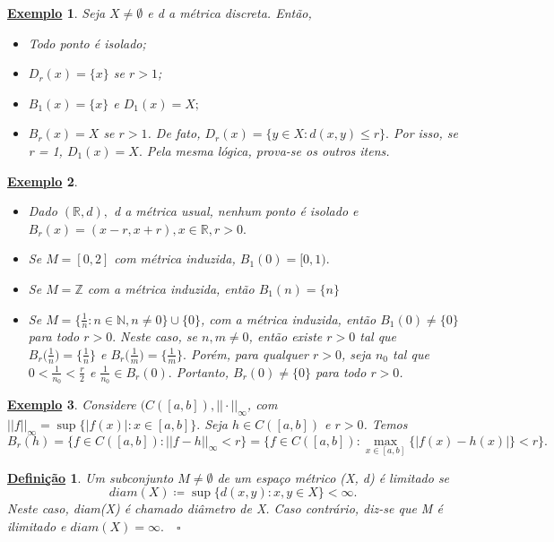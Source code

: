 \documentclass{article}
\newtheorem*{def*}{\underline{Defini\c c\~ao}}
\newtheorem{example}{\underline{Exemplo}}
\begin{document}
\begin{example}
  Seja \(X \neq\emptyset\) e d a métrica discreta. Então, 
 \begin{itemize}
   \item[-] Todo ponto é isolado;
   \item[-] \(D_{r}(x) = \{x\}\) se \(r > 1\);
   \item[-] \(B_{1}(x) = \{x\}\) e \(D_{1}(x) = X;\)
   \item[-] \(B_{r}(x) = X\) se \(r > 1\).
  De fato, \(D_{r}(x) = \{y\in X: d(x, y)\leq r\}.\) Por isso, se r = 1, \(D_{1}(x) = X.\) Pela mesma lógica, prova-se os outros itens.
 \end{itemize}
\end{example}
\begin{example}
\begin{itemize}
  \item[i)] Dado \((\mathbb{R}, d),\) d a métrica usual, nenhum ponto é isolado e \(B_{r}(x) = (x-r, x+r), x\in \mathbb{R}, r > 0.\)
  \item[ii)] Se \(M=[0, 2]\) com métrica induzida, \(B_{1}(0) = [0, 1).\)
  \item[iii)] Se \(M=\mathbb{Z}\) com a métrica induzida, então \(B_{1}(n) = \{n\}\)
  \item[iv)] Se \(M=\{\frac{1}{n}:n\in \mathbb{N}, n\neq0\}\cup\{0\}\), com a métrica induzida, então \(B_{1}(0)\neq\{0\}\) para todo \(r>0.\) 
Neste caso, se \(n, m\neq 0\), então existe \(r > 0\) tal que \(B_{r}\biggl(\frac{1}{n}\biggr)=\{\frac{1}{n}\}\) e \(B_{r}\biggl(\frac{1}{m}\biggr)=\{\frac{1}{m}\}.\) Porém,
para qualquer \(r> 0\), seja \(n_{0}\) tal que \(0 < \frac{1}{n_{0}} < \frac{r}{2}\) e \(\frac{1}{n_{0}}\in B_{r}(0).\) Portanto, \(B_{r}(0)\neq\{0\}\) para todo \(r> 0\).
\end{itemize}
\end{example}
\begin{example}
  Considere \((C([a, b]), ||\cdot ||_{\infty}\), com \(||f||_{\infty} = \sup\{|f(x)|: x\in[a, b]\}.\) Seja
 \(h\in C([a, b])\) e \(r > 0\). Temos 
   \[
     B_{r}(h) = \{f\in C([a, b]): ||f-h||_{\infty} < r\} = \{f\in C([a, b]):\max_{x\in[a, b]}\{|f(x)-h(x)|\} < r\}.
   \]
\end{example}
\begin{def*}
  Um subconjunto \(M \neq\emptyset\) de um espaço métrico (X, d) é limitado se 
    \[
      diam(X)\coloneqq \sup\{d(x, y):x, y\in X\} < \infty.
    \]
    Neste caso, diam(X) é chamado diâmetro de X. Caso contrário, diz-se que M é ilimitado e \(diam(X) = \infty.\quad\square\)
  \end{def*}
\end{document}
